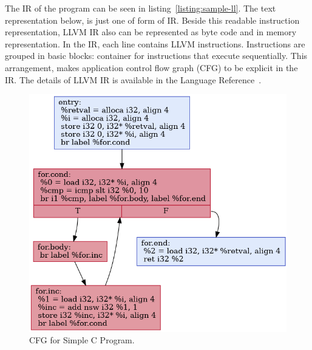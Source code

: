 
The IR of the program can be seen in listing~\ref{listing:sample-ll}. The text
representation below, is just one of form of IR. Beside this readable
instruction representation, LLVM IR also can be represented as byte code and in
memory representation. In the IR, each line contains LLVM instructions.
Instructions are grouped in basic blocks: container for instructions that
execute sequentially. This arrangement, makes application control flow graph
(CFG) to be explicit in the IR. The details of LLVM IR is available in the
Language Reference~\cite{LLVMLanguageReferencea}.



\begin{figure}[ht]
    \centerline{\includegraphics[scale=.75]{Figures/03/cfg.png}}
    \caption{CFG for Simple C Program.}
    \label{fig:cfg}
\end{figure}


